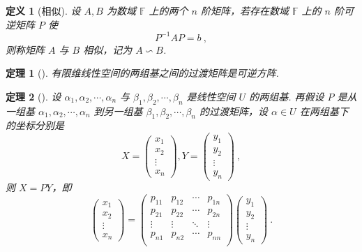 \documentclass[zihao=-4,UTF8,linespread=1.8,nothm]{aytony_base}
\newtheorem{theorem}{\indent 定理}[subsection]
\newtheorem{definition}{\indent 定义}[subsection]
\begin{document}
\begin{definition}[相似]
    设 $A, B$ 为数域 $\mathbb{F}$ 上的两个 $n$ 阶矩阵，若存在数域 $\mathbb{F}$ 上的 $n$ 阶可逆矩阵 $P$ 使 $$
        P^{-1}AP = b\ ,
    $$ 则称矩阵 $A$ 与 $B$ 相似，记为 $A \backsim B$.
\end{definition}

\begin{theorem}[]
    有限维线性空间的两组基之间的过渡矩阵是可逆方阵.
\end{theorem}

\begin{theorem}[]
    设 $\alpha_1, \alpha_2, \cdots, \alpha_n$ 与 $\beta_1, \beta_2, \cdots, \beta_{n}$ 是线性空间 $U$ 的两组基. 再假设 $P$ 是从一组基 ${\alpha}_1, {\alpha}_2, \cdots, {\alpha}_{n}$ 到另一组基 ${\beta}_1, {\beta}_2, \cdots, {\beta}_{n}$ 的过渡矩阵，设 $\alpha \in U$ 在两组基下的坐标分别是 $$
        X = \left(
        \begin{matrix}
                x_1 \\x_2\\\vdots\\x_n
            \end{matrix}
        \right),
        Y = \left(
        \begin{matrix}
                y_1 \\y_2\\\vdots\\y_n
            \end{matrix}
        \right)\ ,
    $$ 则 $X = PY$，即 $$
        \left(
        \begin{matrix}
                x_1 \\x_2\\\vdots\\x_n
            \end{matrix}
        \right) = \left(
        \begin{matrix}
                p_{11} & p_{12} & \cdots & p_{1n} \\
                p_{21} & p_{22} & \cdots & p_{2n} \\
                \vdots & \vdots & \ddots & \vdots \\
                p_{n1} & p_{n2} & \cdots & p_{nn} \\
            \end{matrix}
        \right)\left(
        \begin{matrix}
                y_1 \\y_2\\\vdots\\y_n
            \end{matrix}
        \right)\ .
    $$
\end{theorem}
\end{document}
